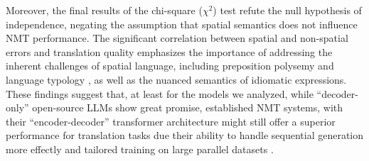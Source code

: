 Moreover, the final results of the chi-square ($\chi^2$) test refute the null hypothesis of independence, negating the assumption that spatial semantics does not influence NMT performance. The significant correlation between spatial and non-spatial errors and translation quality emphasizes the importance of addressing the inherent challenges of spatial language, including preposition polysemy \parencite{coventry:04b, herskovits1986language} and language typology \parencite{talmy2000towardb, McCleary-Viotti-2004, slobin2005relating, cadierno2017thinking, oliveira2022expressing}, as well as the nuanced semantics of idiomatic expressions. These findings suggest that, at least for the models we analyzed, while ``decoder-only'' open-source LLMs show great promise, established NMT systems, with their ``encoder-decoder'' transformer architecture might still offer a superior performance for translation tasks due their ability to handle sequential generation more effectly and tailored training on large parallel  datasets \parencite{lakew2019multilingual, koehn2020neural}.






